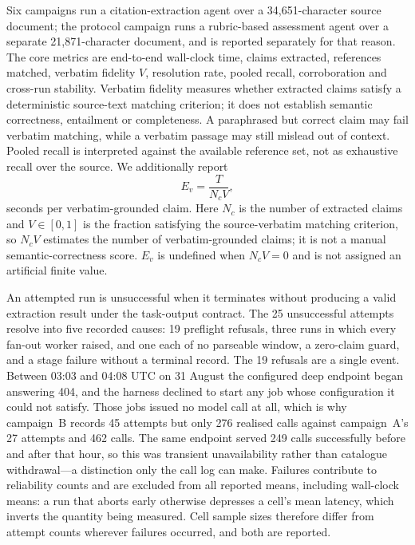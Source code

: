 \documentclass[conference]{IEEEtran}
\begin{document}
Six campaigns run a citation-extraction agent over a 34{,}651-character source document; the protocol campaign runs a rubric-based assessment agent over a separate 21{,}871-character document, and is reported separately for that reason. The core metrics are end-to-end wall-clock time, claims extracted, references matched, verbatim fidelity $V$, resolution rate, pooled recall, corroboration and cross-run stability. Verbatim fidelity measures whether extracted claims satisfy a deterministic source-text matching criterion; it does not establish semantic correctness, entailment or completeness. A paraphrased but correct claim may fail verbatim matching, while a verbatim passage may still mislead out of context. Pooled recall is interpreted against the available reference set, not as exhaustive recall over the source. We additionally report
\begin{equation}
E_v=\frac{T}{N_cV},
\end{equation}
seconds per verbatim-grounded claim. Here $N_c$ is the number of extracted claims and $V\in[0,1]$ is the fraction satisfying the source-verbatim matching criterion, so $N_cV$ estimates the number of verbatim-grounded claims; it is not a manual semantic-correctness score. $E_v$ is undefined when $N_cV=0$ and is not assigned an artificial finite value.

An attempted run is unsuccessful when it terminates without producing a valid extraction result under the task-output contract. The 25 unsuccessful attempts resolve into five recorded causes: 19 preflight refusals, three runs in which every fan-out worker raised, and one each of no parseable window, a zero-claim guard, and a stage failure without a terminal record. The 19 refusals are a single event. Between 03:03 and 04:08 UTC on 31 August the configured deep endpoint began answering 404, and the harness declined to start any job whose configuration it could not satisfy. Those jobs issued no model call at all, which is why campaign~B records 45 attempts but only 276 realised calls against campaign~A's 27 attempts and 462 calls. The same endpoint served 249 calls successfully before and after that hour, so this was transient unavailability rather than catalogue withdrawal---a distinction only the call log can make. Failures contribute to reliability counts and are excluded from all reported means, including wall-clock means: a run that aborts early otherwise depresses a cell's mean latency, which inverts the quantity being measured. Cell sample sizes therefore differ from attempt counts wherever failures occurred, and both are reported.
\end{document}
